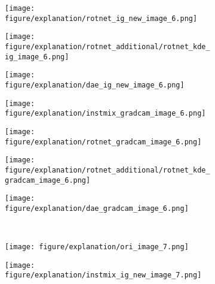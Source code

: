 \documentclass{article} \usepackage{iclr2021_conference,times}
\begin{document}
\begin{figure}[h!]
\begin{subfigure}{.11\textwidth}
\end{subfigure}
\hspace{-2mm}
\begin{subfigure}{.11\textwidth}
  \centering
  \texttt{[image: figure/explanation/rotnet\_ig\_new\_image\_6.png]}
\end{subfigure}
\hspace{-2mm}
\begin{subfigure}{.11\textwidth}
  \centering
  \texttt{[image: figure/explanation/rotnet\_additional/rotnet\_kde\_ig\_image\_6.png]}
\end{subfigure}
\hspace{-2mm}
\begin{subfigure}{.11\textwidth}
  \centering
  \texttt{[image: figure/explanation/dae\_ig\_new\_image\_6.png]}
\end{subfigure}
\hspace{-2mm}
\begin{subfigure}{.11\textwidth}
  \centering
  \texttt{[image: figure/explanation/instmix\_gradcam\_image\_6.png]}
\end{subfigure}
\hspace{-2mm}
\begin{subfigure}{.11\textwidth}
  \centering
  \texttt{[image: figure/explanation/rotnet\_gradcam\_image\_6.png]}
\end{subfigure}
\hspace{-2mm}
\begin{subfigure}{.11\textwidth}
  \centering
  \texttt{[image: figure/explanation/rotnet\_additional/rotnet\_kde\_gradcam\_image\_6.png]}
\end{subfigure}
\hspace{-2mm}
\begin{subfigure}{.11\textwidth}
  \centering
  \texttt{[image: figure/explanation/dae\_gradcam\_image\_6.png]}
\end{subfigure}\\
\begin{subfigure}{.11\textwidth}
  \centering
  \texttt{[image: figure/explanation/ori\_image\_7.png]}
\end{subfigure}
\hspace{-2mm}
\begin{subfigure}{.11\textwidth}
  \centering
  \texttt{[image: figure/explanation/instmix\_ig\_new\_image\_7.png]}
\end{subfigure}
\hspace{-2mm}

\end{figure}
\end{document}

